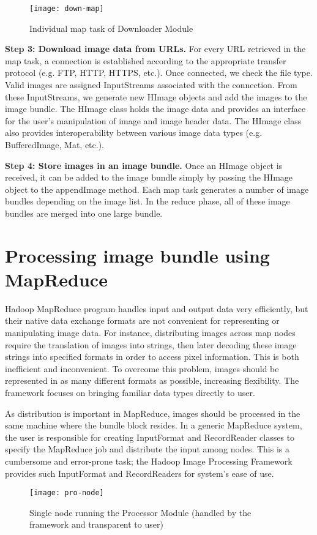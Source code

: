 \begin{figure}[h]
	\centering
	\texttt{[image: down-map]}
	\caption{Individual map task of Downloader Module}
	\label{fig:down-map}
\end{figure}

\textbf{Step 3: Download image data from URLs.}  For every URL
retrieved in the map task, a connection is established according to
the appropriate transfer protocol (e.g. FTP, HTTP, HTTPS, etc.). Once
connected, we check the file type.  Valid images are assigned
InputStreams associated with the connection. From these InputStreams,
we generate new HImage objects and add the images to the image
bundle. The HImage class holds the image data and provides an
interface for the user's manipulation of image and image header
data. The HImage class also provides interoperability between various
image data types (e.g. BufferedImage, Mat, etc.).

\textbf{ Step 4: Store images in an image bundle. }  Once an HImage
object is received, it can be added to the image bundle simply by
passing the HImage object to the appendImage method. Each map task
generates a number of image bundles depending on the image list. In
the reduce phase, all of these image bundles are merged into one large
bundle.


\section{Processing image bundle using MapReduce}
Hadoop MapReduce program handles input and output data very
efficiently, but their native data exchange formats are not convenient
for representing or manipulating image data.  For instance,
distributing images across map nodes require the translation of images
into strings, then later decoding these image strings into specified
formats in order to access pixel information.  This is both
inefficient and inconvenient. To overcome this problem, images should
be represented in as many different formats as possible, increasing
flexibility. The framework focuses on bringing familiar data types
directly to user.

As distribution is important in MapReduce, images should be processed
in the same machine where the bundle block resides. In a generic
MapReduce system, the user is responsible for creating InputFormat and
RecordReader classes to specify the MapReduce job and distribute the
input among nodes. This is a cumbersome and error-prone task; the
Hadoop Image Processing Framework provides such InputFormat and
RecordReaders for system's ease of use.
\begin{figure}[h]
	\centering
	\texttt{[image: pro-node]}
	\caption{Single node running the Processor Module (handled by
		the framework and transparent to user)}
	\label{fig:pro-node}
\end{figure}


